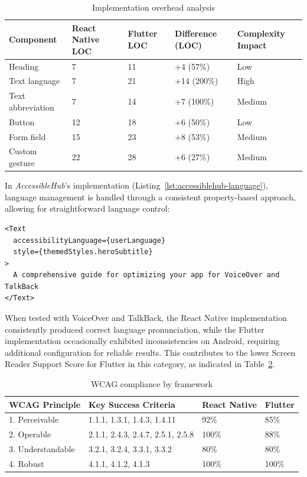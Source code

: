\begin{table}[ht]
\caption{Implementation overhead analysis}
\label{tab:implementation_overhead_analysis}
\centering
\begin{tabular}{|p{2.5cm}|p{2.5cm}|p{2.5cm}|p{2.5cm}|p{2.5cm}|}
\hline
\textbf{Component} & \textbf{React Native LOC} & \textbf{Flutter LOC} & \textbf{Difference (LOC)} & \textbf{Complexity Impact} \\
\hline
Heading & 7 & 11 & +4 (57\%) & Low \\
\hline
Text language & 7 & 21 & +14 (200\%) & High \\
\hline
Text abbreviation & 7 & 14 & +7 (100\%) & Medium \\
\hline
Button & 12 & 18 & +6 (50\%) & Low \\
\hline
Form field & 15 & 23 & +8 (53\%) & Medium \\
\hline
Custom gesture & 22 & 28 & +6 (27\%) & Medium \\
\hline
\end{tabular}
\end{table}

In \textit{AccessibleHub}'s implementation (Listing~\ref{lst:accessiblehub-language}), language management is handled through a consistent property-based approach, allowing for straightforward language control:

\begin{lstlisting}[style=ReactNativeStyle, caption=Language handling in AccessibleHub, label=lst:accessiblehub-language]
<Text 
  accessibilityLanguage={userLanguage} 
  style={themedStyles.heroSubtitle}
>
  A comprehensive guide for optimizing your app for VoiceOver and TalkBack
</Text>
\end{lstlisting}

When tested with VoiceOver and TalkBack, the React Native implementation consistently produced correct language pronunciation, while the Flutter implementation occasionally exhibited inconsistencies on Android, requiring additional configuration for reliable results. This contributes to the lower Screen Reader Support Score for Flutter in this category, as indicated in Table~\ref{tab:wcag_compliance_comparison}.

\begin{table}[ht]
\caption{WCAG compliance by framework}
\label{tab:wcag_compliance_comparison}
\centering
\begin{tabular}{|p{2.5cm}|p{5cm}|p{3cm}|p{3cm}|}
\hline
\textbf{WCAG Principle} & \textbf{Key Success Criteria} & \textbf{React Native} & \textbf{Flutter} \\
\hline
1. Perceivable & 1.1.1, 1.3.1, 1.4.3, 1.4.11 & 92\% & 85\% \\
\hline
2. Operable & 2.1.1, 2.4.3, 2.4.7, 2.5.1, 2.5.8 & 100\% & 88\% \\
\hline
3. Understandable & 3.2.1, 3.2.4, 3.3.1, 3.3.2 & 80\% & 80\% \\
\hline
4. Robust & 4.1.1, 4.1.2, 4.1.3 & 100\% & 100\% \\
\hline
\end{tabular}
\end{table}

